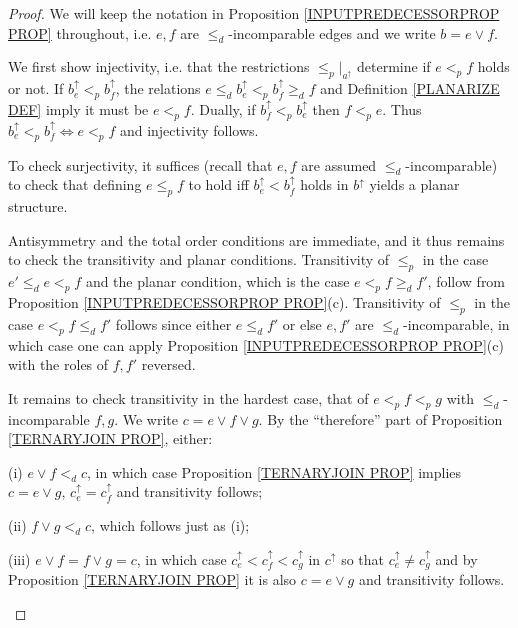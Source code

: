 \documentclass[a4paper,10pt
,draft
]{article}%
\numberwithin{equation}{section}
\numberwithin{figure}{section}
\theoremstyle{definition} %
\newcommand{\1}{\ensuremath{\mathbbm 1}}%
\begin{document}
\begin{proof}
We will keep the notation in Proposition \ref{INPUTPREDECESSORPROP PROP} throughout,
i.e. $e, f$ are $\leq_d$-incomparable edges and we write $b = e \vee f$. 

	We first show injectivity,
	i.e. that the restrictions $\leq_p|_{a^{\uparrow}}$ determine if 
	$e <_p f$ holds or not.
If $b^{\uparrow}_e <_p b^{\uparrow}_f$, the relations
$e \leq_d b^{\uparrow}_e <_p b^{\uparrow}_f \geq_d f$
and Definition \ref{PLANARIZE DEF} imply it must be $e <_p f$.
Dually, if $b^{\uparrow}_f <_p b^{\uparrow}_e$ then 
$f <_p e$. Thus 
$b^{\uparrow}_e <_p b^{\uparrow}_f \Leftrightarrow e <_p f$ and injectivity follows.

To check surjectivity, 
 it suffices (recall that $e,f$ are assumed $\leq_d$-incomparable) to check that
defining $e \leq_p f$ to hold iff $b^{\uparrow}_e < b^{\uparrow}_f$ holds in $b^{\uparrow}$ yields a planar structure.

Antisymmetry and the total order conditions are immediate, and it thus remains to check the transitivity and planar conditions.
Transitivity of $\leq_p$ in the case $e' \leq_d e <_p f$ and the planar condition, which is the case $e <_p f \geq_d f'$, follow from Proposition \ref{INPUTPREDECESSORPROP PROP}(c). Transitivity of $\leq_p$ in the case $e <_p f \leq_d f'$
follows since either $e \leq_d f'$ or else $e,f'$ are $\leq_d$-incomparable, in which case one can apply Proposition \ref{INPUTPREDECESSORPROP PROP}(c) with the roles of $f,f'$ reversed.

It remains to check transitivity in the hardest case, that of 
$e <_p f <_p g$ with $\leq_d$-incomparable $f,g$.
We write $c = e \vee f \vee g$.
By the ``therefore'' part of Proposition \ref{TERNARYJOIN PROP}, either:
\begin{inparaenum}
	\item[(i)] $e \vee f <_d c$, in which case 
	Proposition \ref{TERNARYJOIN PROP}
	implies 
	$c=e \vee g$,
	$c^{\uparrow}_e = c^{\uparrow}_f$ and transitivity follows;
	\item[(ii)] $f \vee g <_d c$, which follows just as (i);
	\item[(iii)]  
$e \vee f = f \vee g =c$, in which case 
$c^{\uparrow}_e <
c^{\uparrow}_f <
c^{\uparrow}_g $ in $c^{\uparrow}$
so that $c^{\uparrow}_e \neq c^{\uparrow}_g$ and by Proposition \ref{TERNARYJOIN PROP} it is also 
$c = e \vee g$ and transitivity follows.
\end{inparaenum}
\end{proof}
\end{document}
